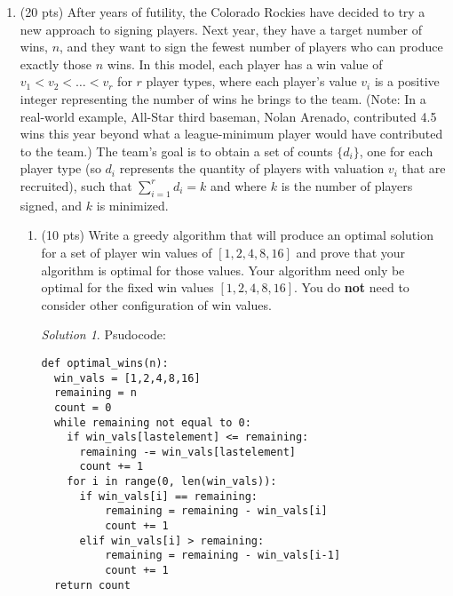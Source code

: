 \documentclass[12pt]{article}
\theoremstyle{remark}
\newtheorem*{solution}{Solution}
\begin{document}
\begin{enumerate}
\item (20 pts) After years of futility, the Colorado Rockies have decided to try a new approach to signing players. Next year, they have a target number of wins, $n$, and they want to sign the fewest number of players who can produce exactly those $n$ wins. In this model, each player has a win value of $v_{1}<v_{2}<\dots<v_{r}$ for $r$ player types, where each player's value $v_{i}$ is a positive integer representing the number of wins he brings to the team. (Note: In a real-world example, All-Star third baseman, Nolan Arenado, contributed 4.5 wins this year beyond what a league-minimum player would have contributed to the team.) 
The team's goal is to obtain a set of counts $\{d_{i}\}$, one for each player type (so $d_{i}$ represents the quantity of players with valuation $v_{i}$ that are recruited), such that $\sum_{i=1}^{r}d_{i}=k$ and where $k$ is the number of players signed, and $k$ is minimized.
	\begin{enumerate}
	\item  (10 pts) Write a greedy algorithm that will produce an optimal solution for a set of player win values of $[1, 2, 4, 8, 16]$ and prove that your algorithm is optimal for those values. Your algorithm need only be optimal for the fixed win values $[1, 2, 4, 8, 16]$. You do \textbf{not} need to consider other configuration of win values.
	\begin{solution}
Psudocode:\\ 
\begin{verbatim}
def optimal_wins(n):
  win_vals = [1,2,4,8,16]
  remaining = n
  count = 0
  while remaining not equal to 0:
    if win_vals[lastelement] <= remaining:
      remaining -= win_vals[lastelement]
      count += 1
    for i in range(0, len(win_vals)):
      if win_vals[i] == remaining:
          remaining = remaining - win_vals[i]
          count += 1
      elif win_vals[i] > remaining:
          remaining = remaining - win_vals[i-1]
          count += 1
  return count

\end{verbatim}

    \end{solution}
    \pagebreak


\end{enumerate}
\end{enumerate}
\end{document}
